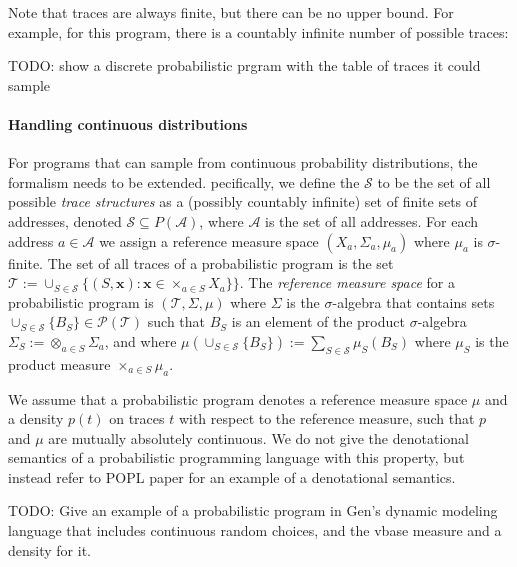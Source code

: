 \documentclass[twoside]{article}
\begin{document}
Note that traces are always finite, but there can be no upper bound.
For example, for this program, there is a countably infinite number of possible traces:

TODO: show a discrete probabilistic prgram with the table of traces it could sample

\paragraph{Handling continuous distributions}
For programs that can sample from continuous probability distributions, the formalism needs to be extended.
pecifically, we define the $\mathcal{S}$ to be the set of all possible \emph{trace structures} as a (possibly countably infinite) set of finite sets of addresses, denoted $\mathcal{S} \subseteq P(\mathcal{A})$, where $\mathcal{A}$ is the set of all addresses.
For each address $a \in \mathcal{A}$ we assign a reference measure space $(X_a, \Sigma_a, \mu_a)$ where $\mu_a$ is $\sigma$-finite.
The set of all traces of a probabilistic program is the set $\mathcal{T} := \cup_{S \in \mathcal{S}} \{(S, \mathbf{x}) : \mathbf{x} \in \times_{a \in S} X_a\}\}$.
The \emph{reference measure space} for a probabilistic program is $(\mathcal{T}, \Sigma, \mu)$ where
$\Sigma$ is the $\sigma$-algebra that contains sets $\cup_{S \in \mathcal{S}}\{ B_S \} \in \mathcal{P}(\mathcal{T})$ such that $B_S$ is an element of the product $\sigma$-algebra $\Sigma_S := \otimes_{a \in S} \Sigma_a$,
and where $\mu(\cup_{S \in \mathcal{S}}\{ B_S \}) := \sum_{S \in \mathcal{S}} \mu_S(B_S)$ where $\mu_S$ is the product measure $\times_{a \in S} \mu_a$.

We assume that a probabilistic program denotes a reference measure space $\mu$ and a density $p(t)$ on traces $t$ with respect to the reference measure, such that $p$ and $\mu$ are mutually absolutely continuous.
We do not give the denotational semantics of a probabilistic programming language with this property, but instead refer to POPL paper for an example of a denotational semantics. %

TODO: Give an example of a probabilistic program in Gen's dynamic modeling language that includes continuous random choices, and the vbase measure and a density for it.

\end{document}
